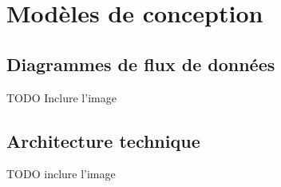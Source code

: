 \section{Modèles de conception}

\subsection{Diagrammes de flux de données}

TODO Inclure l'image

\subsection{Architecture technique}
TODO inclure l'image


